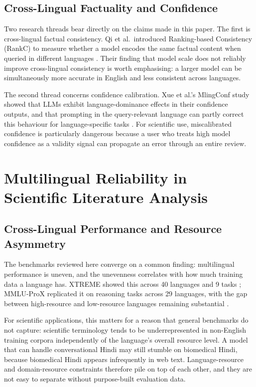 \documentclass[acmsmall,screen,review]{acmart}
\begin{document}
\subsection{Cross-Lingual Factuality and Confidence}
\label{sec:factuality-background}

Two research threads bear directly on the claims made in this paper.  The
first is cross-lingual factual consistency.  Qi et al.\ introduced
Ranking-based Consistency (RankC) to measure whether a model encodes the
same factual content when queried in different languages
\citep{qi2023crosslingual}.  Their finding that model scale does not
reliably improve cross-lingual consistency is worth emphasising: a larger
model can be simultaneously more accurate in English and less consistent
across languages.

The second thread concerns confidence calibration.  Xue et al.'s
MlingConf study showed that LLMs exhibit language-dominance effects in
their confidence outputs, and that prompting in the query-relevant
language can partly correct this behaviour for language-specific tasks
\citep{xue2024mlingconf}.  For scientific use, miscalibrated confidence
is particularly dangerous because a user who treats high model confidence
as a validity signal can propagate an error through an entire review.


\section{Multilingual Reliability in Scientific Literature Analysis}
\label{sec:reliability}

\subsection{Cross-Lingual Performance and Resource Asymmetry}
\label{sec:resource-asymmetry}

The benchmarks reviewed here converge on a common finding: multilingual
performance is uneven, and the unevenness correlates with how much
training data a language has.  XTREME showed this across 40 languages and
9 tasks \citep{hu2020xtreme}; MMLU-ProX replicated it on reasoning tasks
across 29 languages, with the gap between high-resource and low-resource
languages remaining substantial \citep{xuan2025mmlupro}.

For scientific applications, this matters for a reason that general
benchmarks do not capture: scientific terminology tends to be
underrepresented in non-English training corpora independently of the
language's overall resource level.  A model that can handle conversational
Hindi may still stumble on biomedical Hindi, because biomedical Hindi
appears infrequently in web text.  Language-resource and domain-resource
constraints therefore pile on top of each other, and they are not easy to
separate without purpose-built evaluation data.
\end{document}
